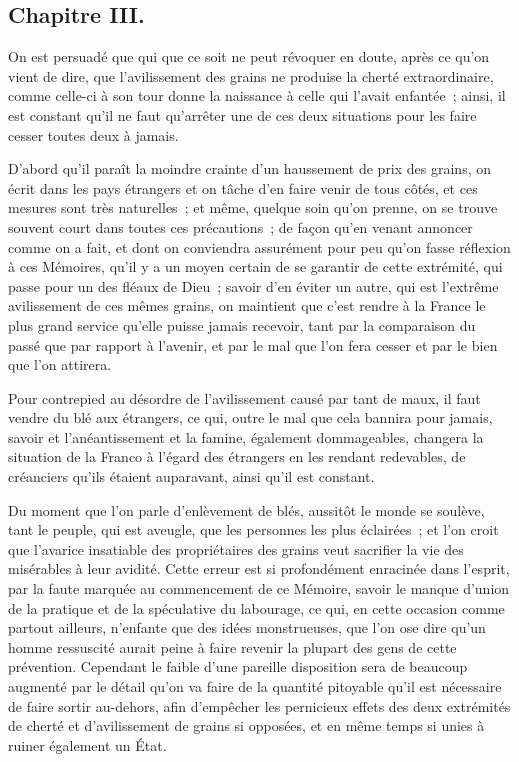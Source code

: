 \documentclass[french,twoside]{book} %
\begin{document}
\subsection[{Chapitre III.}]{Chapitre III.}
\noindent On est persuadé que qui que ce soit ne peut révoquer en doute, après ce qu’on vient de dire, que l’avilissement des grains ne produise la cherté extraordinaire, comme celle-ci à son tour donne la naissance à celle qui l’avait enfantée ; ainsi, il est constant qu’il ne faut qu’arrêter une de ces deux situations pour les faire cesser toutes deux à jamais.\par
D’abord qu’il paraît la moindre crainte d’un haussement de prix des grains, on écrit dans les pays étrangers et on tâche d’en faire venir de tous côtés, et ces mesures sont très naturelles ; et même, quelque soin qu’on prenne, on se trouve souvent court dans toutes ces précautions ; de façon qu’en venant annoncer comme on a fait, et dont on conviendra assurément pour peu qu’on fasse réflexion à ces Mémoires, qu’il y a un moyen certain de se garantir de cette extrémité, qui passe pour un des fléaux de Dieu ; savoir d’en éviter un autre, qui est l’extrême avilissement de ces mêmes grains, on maintient que c’est rendre à la France le plus grand service qu’elle puisse jamais recevoir, tant par la comparaison du passé que par rapport à l’avenir, et par le mal que l’on fera cesser et par le bien que l’on attirera.\par
Pour contrepied au désordre de l’avilissement causé par tant de maux, il faut vendre du blé aux étrangers, ce qui, outre le mal que cela bannira pour jamais, savoir et l’anéantissement et la famine, également dommageables, changera la situation de la Franco à l’égard des étrangers en les rendant redevables, de créanciers qu’ils étaient auparavant, ainsi qu’il est constant.\par
Du moment que l’on parle d’enlèvement de blés, aussitôt le monde se soulève, tant le peuple, qui est aveugle, que les personnes les plus éclairées ; et l’on croit que l’avarice insatiable des propriétaires des grains veut sacrifier la vie des misérables à leur avidité. Cette erreur est si profondément enracinée dans l’esprit, par la faute marquée au commencement de ce Mémoire, savoir le manque d’union de la pratique et de la spéculative du labourage, ce qui, en cette occasion comme partout ailleurs, n’enfante que des idées monstrueuses, que l’on ose dire qu’un homme ressuscité aurait peine à faire revenir la plupart des gens de cette prévention. Cependant le faible d’une pareille disposition sera de beaucoup augmenté par le détail qu’on va faire de la quantité pitoyable qu’il est nécessaire de faire sortir au-dehors, afin d’empêcher les pernicieux effets des deux extrémités de cherté et d’avilissement de grains si opposées, et en même temps si unies à ruiner également un État.\par
\end{document}
